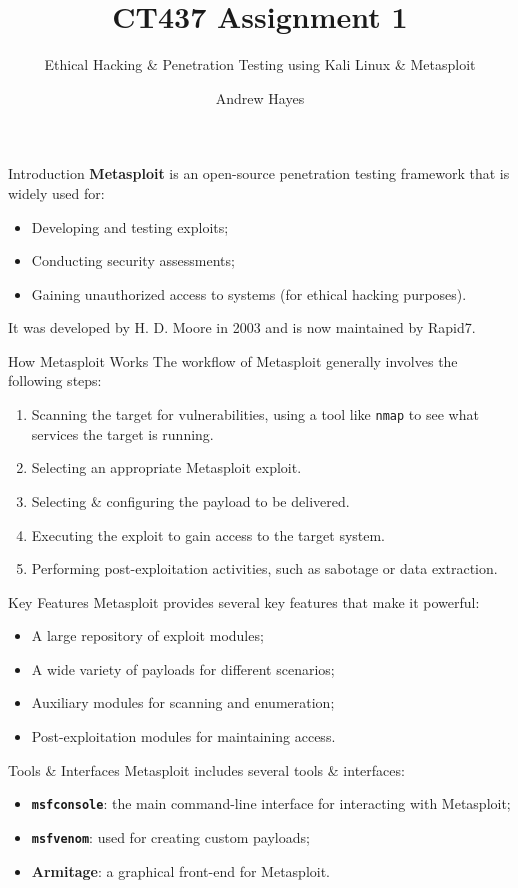 \documentclass[]{beamer}
\author{Andrew Hayes }
\title{CT437 Assignment 1}
\subtitle{Ethical Hacking \& Penetration Testing using Kali Linux \& Metasploit}
\institute{Student ID: 21321503}
\begin{document}
\frame{\titlepage}

\begin{frame}{Introduction}
    \textbf{Metasploit} is an open-source penetration testing framework that is widely used for:
    \begin{itemize}
        \item Developing and testing exploits;
        \item Conducting security assessments;
        \item Gaining unauthorized access to systems (for ethical hacking purposes).
    \end{itemize}

    It was developed by H. D. Moore in 2003 and is now maintained by Rapid7.
\end{frame}

\begin{frame}{How Metasploit Works}
    The workflow of Metasploit generally involves the following steps:
    \begin{enumerate}
        \item Scanning the target for vulnerabilities, using a tool like \texttt{nmap} to see what services the target is running.
        \item Selecting an appropriate Metasploit exploit.
        \item Selecting \& configuring the payload to be delivered.
        \item Executing the exploit to gain access to the target system.
        \item Performing post-exploitation activities, such as sabotage or data extraction.
    \end{enumerate}
\end{frame}

\begin{frame}{Key Features}
    Metasploit provides several key features that make it powerful:
    \begin{itemize}
        \item A large repository of exploit modules;
        \item A wide variety of payloads for different scenarios;
        \item Auxiliary modules for scanning and enumeration;
        \item Post-exploitation modules for maintaining access.
    \end{itemize}
\end{frame}

\begin{frame}{Tools \& Interfaces}
    Metasploit includes several tools \& interfaces:
    \begin{itemize}
        \item \textbf{\texttt{msfconsole}}: the main command-line interface for interacting with Metasploit;
        \item \textbf{\texttt{msfvenom}}: used for creating custom payloads;
        \item \textbf{Armitage}: a graphical front-end for Metasploit.
    \end{itemize}
\end{frame}
\end{document}
